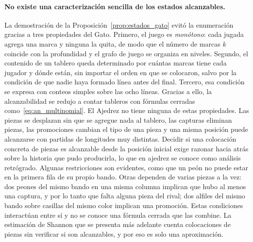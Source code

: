 \paragraph{No existe una caracterización sencilla de los estados alcanzables.} La demostración de la Proposición~\ref{prop:estados_gato} evitó la enumeración gracias a tres propiedades del Gato. Primero, el juego es \emph{monótono}: cada jugada agrega una marca y ninguna la quita, de modo que el número de marcas $k$ coincide con la profundidad y el grafo de juego se organiza en niveles. Segundo, el contenido de un tablero queda determinado por cuántas marcas tiene cada jugador y dónde están, sin importar el orden en que se colocaron, salvo por la condición de que nadie haya formado línea antes del final. Tercero, esa condición se expresa con conteos simples sobre las ocho líneas. Gracias a ello, la alcanzabilidad se redujo a contar tableros con fórmulas cerradas como~\eqref{eq:an_multinomial}. El Ajedrez no tiene ninguna de estas propiedades. Las piezas se desplazan sin que se agregue nada al tablero, las capturas eliminan piezas, las promociones cambian el tipo de una pieza y una misma posición puede alcanzarse con partidas de longitudes muy distintas. Decidir si una colocación concreta de piezas es alcanzable desde la posición inicial exige razonar hacia atrás sobre la historia que pudo producirla, lo que en ajedrez se conoce como análisis retrógrado. Algunas restricciones son evidentes, como que un peón no puede estar en la primera fila de su propio bando. Otras dependen de varias piezas a la vez: dos peones del mismo bando en una misma columna implican que hubo al menos una captura, y por lo tanto que falta alguna pieza del rival; dos alfiles del mismo bando sobre casillas del mismo color implican una promoción. Estas condiciones interactúan entre sí y no se conoce una fórmula cerrada que las combine. La estimación de Shannon que se presenta más adelante cuenta colocaciones de piezas sin verificar si son alcanzables, y por eso es solo una aproximación.

